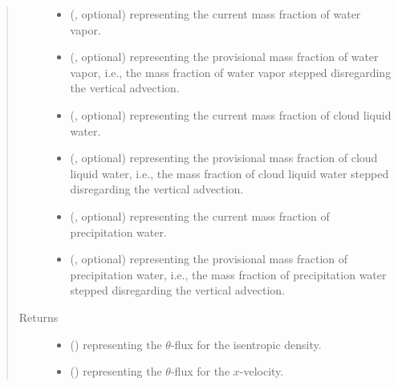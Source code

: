 \documentclass[letterpaper,10pt,english]{sphinxmanual}
\begin{document}
\begin{fulllineitems}
\begin{fulllineitems}
\begin{quote}
\begin{description}
\begin{itemize}
\item {} 
 (, optional) \textendash{}  representing the current mass fraction of water vapor.

\item {} 
 (, optional) \textendash{}  representing the provisional mass fraction of water vapor,
i.e., the mass fraction of water vapor stepped disregarding the vertical advection.

\item {} 
 (, optional) \textendash{}  representing the current mass fraction of cloud liquid water.

\item {} 
 (, optional) \textendash{}  representing the provisional mass fraction of cloud liquid water,
i.e., the mass fraction of cloud liquid water stepped disregarding the vertical advection.

\item {} 
 (, optional) \textendash{}  representing the current mass fraction of precipitation water.

\item {} 
 (, optional) \textendash{}  representing the provisional mass fraction of precipitation water,
i.e., the mass fraction of precipitation water stepped disregarding the vertical advection.

\end{itemize}

\item[{Returns}] \leavevmode
\begin{itemize}
\item {} 
 () \textendash{}  representing the \(\theta\)-flux for the isentropic density.

\item {} 
 () \textendash{}  representing the \(\theta\)-flux for the \(x\)-velocity.


\end{itemize}
\end{description}
\end{quote}
\end{fulllineitems}
\end{fulllineitems}
\end{document}
